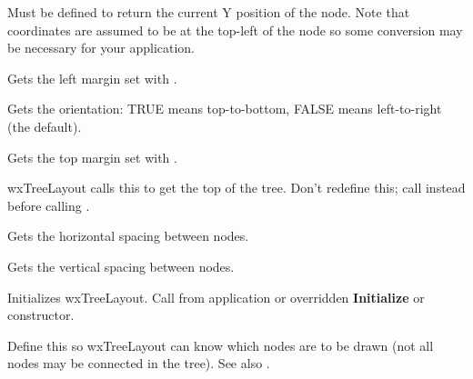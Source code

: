 Must be defined to return the current Y position of the node. Note that
coordinates are assumed to be at the top-left of the node so some conversion
may be necessary for your application.



Gets the left margin set with .



Gets the orientation: TRUE means top-to-bottom, FALSE means left-to-right (the default).



Gets the top margin set with .



wxTreeLayout calls this to get the top of the tree. Don't redefine this; call
\rtfsp{} instead before calling .



Gets the horizontal spacing between nodes.



Gets the vertical spacing between nodes.



Initializes wxTreeLayout. Call from application or overridden {\bf Initialize}
or constructor.

\label{wxtreelayoutnodeactive}


Define this so wxTreeLayout can know which nodes are to be drawn (not all
nodes may be connected in the tree). See also .

